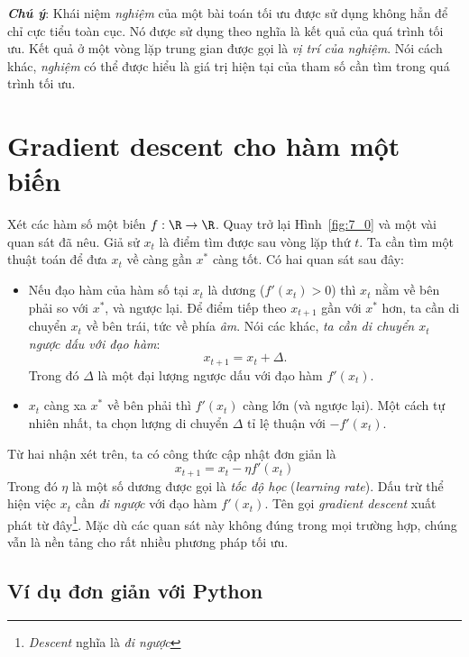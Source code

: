 \textit{\textbf{Chú ý}}: Khái niệm \textit{nghiệm} của một bài toán tối ưu được sử dụng không hẳn để chỉ cực tiểu toàn cục. Nó được sử dụng theo nghĩa là kết quả của quá trình tối ưu. Kết quả ở một vòng lặp trung gian được gọi là \textit{vị trí của nghiệm}. Nói cách khác, \textit{nghiệm} có thể được hiểu là giá trị hiện tại của tham số cần tìm trong quá trình tối ưu.



\section{Gradient descent cho hàm một biến}
Xét các hàm số một biến $f: \R \rightarrow \R$. Quay trở lại Hình~\ref{fig:7_0}
và một vài quan sát đã nêu. Giả sử  $x_{t}$ là điểm tìm được sau vòng lặp thứ
$t$. Ta cần tìm một thuật toán để đưa $x_{t}$ về càng gần $x^*$ càng tốt. Có hai
quan sát sau đây:
\begin{itemize}
\item Nếu đạo hàm của hàm số tại $x_{t}$ là dương ($f'(x_{t}) > 0$) thì
$x_t$ nằm
về bên phải so với $x^*$, và ngược lại. Để điểm tiếp theo $x_{t+1}$ gần với
$x^*$ hơn, ta cần di chuyển $x_t$ về bên trái, tức về phía
\textit{âm}. Nói các khác, \textit{ta cần di chuyển $x_t$ ngược dấu với đạo hàm}:
\begin{equation}
x_{t+1} = x_t + \Delta.
\end{equation}
Trong đó $\Delta$ là một đại lượng ngược dấu với đạo hàm $f'(x_t)$.

\item $x_t$ càng xa $x^*$ về bên phải thì $f'(x_t)$ càng lớn (và
ngược lại). Một cách tự nhiên nhất, ta chọn lượng di chuyển $\Delta$ tỉ lệ
thuận với $-f'(x_t)$.
\end{itemize}
Từ hai nhận xét trên, ta có công thức cập nhật đơn giản là
\begin{equation}
\boxed{
x_{t+1} = x_t - \eta f'(x_t)
}
\end{equation}
Trong đó $\eta$ là một số dương được gọi là \textit{tốc độ học}
(\textit{learning rate}). Dấu trừ thể hiện việc $x_t$ cần \textit{đi ngược} với
đạo hàm $f'(x_t)$. Tên gọi \textit{gradient descent} xuất phát từ đây\footnote{
\textit{Descent} nghĩa là \textit{đi ngược}}. Mặc dù các quan sát này không đúng
trong mọi trường hợp, chúng vẫn là nền tảng cho rất nhiều phương pháp tối ưu.

\subsection{Ví dụ đơn giản với Python}

